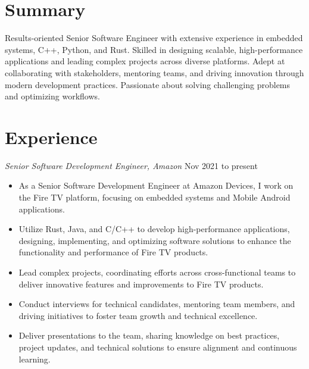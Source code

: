 \documentclass[line,margin]{res}
\begin{document}
\address{alvarofleith@gmail.com}


\begin{resume}

\section{Summary}       Results-oriented Senior Software Engineer with extensive experience in embedded systems, C++, Python, and Rust. Skilled in designing scalable, high-performance applications and leading complex projects across diverse platforms. Adept at collaborating with stakeholders, mentoring teams, and driving innovation through modern development practices. Passionate about solving challenging problems and optimizing workflows.


 \section{Experience} 

{\sl Senior Software Development Engineer, Amazon} \hfill Nov 2021 to present \\
                 \begin{itemize}  \itemsep -2pt
                 \item As a Senior Software Development Engineer at Amazon Devices, I work on the Fire TV platform, focusing on embedded systems and Mobile Android applications.
		 \item Utilize Rust, Java, and C/C++ to develop high-performance applications, designing, implementing, and optimizing software solutions to enhance the functionality and performance of Fire TV products.               
		 \item Lead complex projects, coordinating efforts across cross-functional teams to deliver innovative features and improvements to Fire TV products.
                 \item Conduct interviews for technical candidates, mentoring team members, and driving initiatives to foster team growth and technical excellence.
                 \item Deliver presentations to the team, sharing knowledge on best practices, project updates, and technical solutions to ensure alignment and continuous learning.
                \end{itemize}



\end{resume}
\end{document}
